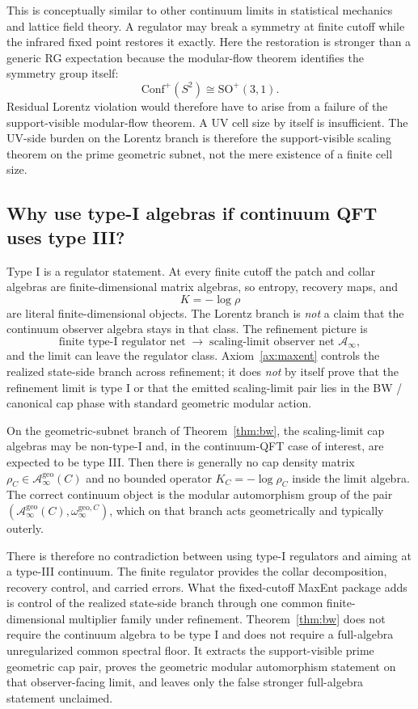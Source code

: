 \documentclass[11pt]{article}
\newcommand{\Conf}{\mathrm{Conf}}
\begin{document}
This is conceptually similar to other continuum limits in statistical mechanics and lattice field theory. A regulator may break a symmetry at finite cutoff while the infrared fixed point restores it exactly. Here the restoration is stronger than a generic RG expectation because the modular-flow theorem identifies the symmetry group itself:
\[
\Conf^+(S^2)\cong \mathrm{SO}^+(3,1).
\]
Residual Lorentz violation would therefore have to arise from a failure of the support-visible modular-flow theorem. A UV cell size by itself is insufficient.
The UV-side burden on the Lorentz branch is therefore the support-visible scaling theorem on the prime geometric subnet, not the mere existence of a finite cell size.

\subsection{Why use type-I algebras if continuum QFT uses type III?}

Type I is a regulator statement. At every finite cutoff the patch and collar algebras are finite-dimensional matrix algebras, so entropy, recovery maps, and
\[
K=-\log\rho
\]
are literal finite-dimensional objects. The Lorentz branch is \emph{not} a claim that the continuum observer algebra stays in that class. The refinement picture is
\[
\text{finite type-I regulator net}
\;\longrightarrow\;
\text{scaling-limit observer net } \mathcal A_\infty,
\]
and the limit can leave the regulator class. Axiom~\ref{ax:maxent} controls the realized state-side branch across refinement; it does \emph{not} by itself prove that the refinement limit is type I or that the emitted scaling-limit pair lies in the BW / canonical cap phase with standard geometric modular action.

On the geometric-subnet branch of Theorem~\ref{thm:bw}, the scaling-limit cap algebras may be non-type-I and, in the continuum-QFT case of interest, are expected to be type III. Then there is generally no cap density matrix \(\rho_C\in \mathcal A_\infty^{\mathrm{geo}}(C)\) and no bounded operator \(K_C=-\log\rho_C\) inside the limit algebra. The correct continuum object is the modular automorphism group of the pair \((\mathcal A_\infty^{\mathrm{geo}}(C),\omega_\infty^{\mathrm{geo},C})\), which on that branch acts geometrically and typically outerly.

There is therefore no contradiction between using type-I regulators and aiming at a type-III continuum. The finite regulator provides the collar decomposition, recovery control, and carried errors. What the fixed-cutoff MaxEnt package adds is control of the realized state-side branch through one common finite-dimensional multiplier family under refinement. Theorem~\ref{thm:bw} does not require the continuum algebra to be type I and does not require a full-algebra unregularized common spectral floor. It extracts the support-visible prime geometric cap pair, proves the geometric modular automorphism statement on that observer-facing limit, and leaves only the false stronger full-algebra statement unclaimed.
\end{document}
